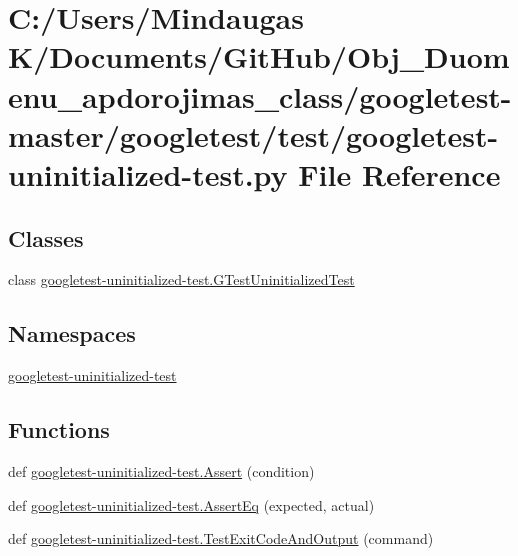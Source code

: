 \hypertarget{googletest-master_2googletest_2test_2googletest-uninitialized-test_8py}{}\section{C\+:/\+Users/\+Mindaugas K/\+Documents/\+Git\+Hub/\+Obj\+\_\+\+Duomenu\+\_\+apdorojimas\+\_\+class/googletest-\/master/googletest/test/googletest-\/uninitialized-\/test.py File Reference}
\label{googletest-master_2googletest_2test_2googletest-uninitialized-test_8py}
\subsection*{Classes}
\begin{DoxyCompactItemize}
\item 
class \mbox{\hyperlink{classgoogletest-uninitialized-test_1_1_g_test_uninitialized_test}{googletest-\/uninitialized-\/test.\+G\+Test\+Uninitialized\+Test}}
\end{DoxyCompactItemize}
\subsection*{Namespaces}
\begin{DoxyCompactItemize}
\item 
 \mbox{\hyperlink{namespacegoogletest-uninitialized-test}{googletest-\/uninitialized-\/test}}
\end{DoxyCompactItemize}
\subsection*{Functions}
\begin{DoxyCompactItemize}
\item 
def \mbox{\hyperlink{namespacegoogletest-uninitialized-test_af02e731714736167bb758ba94b8ec109}{googletest-\/uninitialized-\/test.\+Assert}} (condition)
\item 
def \mbox{\hyperlink{namespacegoogletest-uninitialized-test_a8b48f5e81e60f11030082240561c7f94}{googletest-\/uninitialized-\/test.\+Assert\+Eq}} (expected, actual)
\item 
def \mbox{\hyperlink{namespacegoogletest-uninitialized-test_a70d1a3c3521654597facb5344ee1c968}{googletest-\/uninitialized-\/test.\+Test\+Exit\+Code\+And\+Output}} (command)
\end{DoxyCompactItemize}
